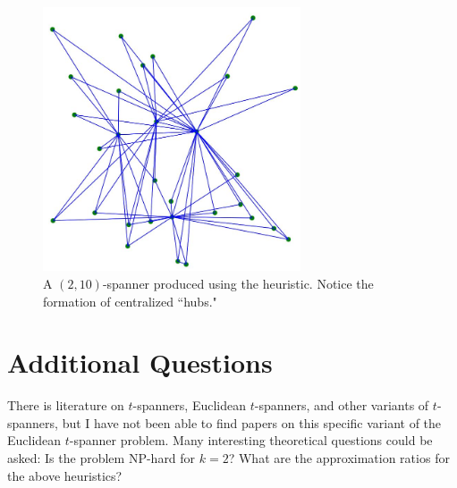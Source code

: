\documentclass[12pt]{article}
\theoremstyle{definition}
\begin{document}
\begin{figure}[h]
\centering
\includegraphics[width=3in]{images/spanner-2}
\caption{A $(2,10)$-spanner produced using the heuristic. Notice the formation of centralized ``hubs."}
\label{fig:hub}
\end{figure}

\section{Additional Questions}
There is literature on $t$-spanners, Euclidean $t$-spanners, and other variants of $t$-spanners, but I have not been able to find papers on this specific variant of the Euclidean $t$-spanner problem. Many interesting theoretical questions could be asked: Is the problem NP-hard for $k = 2$? What are the approximation ratios for the above heuristics? 

\newpage

 
{}
\end{document}
